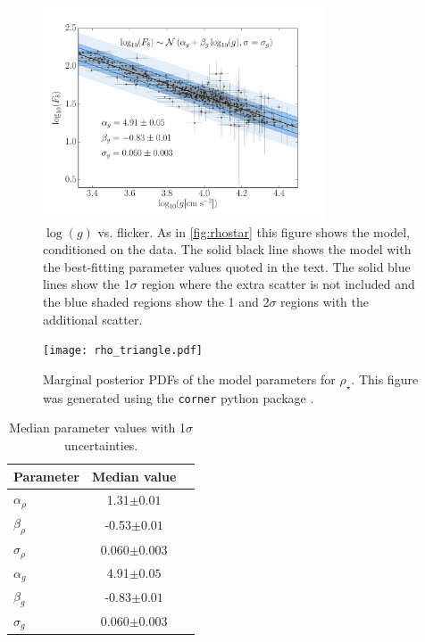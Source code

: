 \documentclass[apjl]{emulateapj}
\newcommand{\rhostar}{$\rho_{\star}$}
\begin{document}
\begin{figure}
\begin{center}
\includegraphics[width=8.4cm,angle=0,clip=true]{flicker_vs_logg.pdf}
\caption{
$\log(g)$ vs. flicker.
As in \ref{fig:rhostar} this figure shows the model, conditioned on the data.
The solid black line shows the model with the best-fitting parameter values
quoted in the text.
The solid blue lines show the 1$\sigma$ region where the extra scatter is not
included and the blue shaded regions show the 1 and 2$\sigma$ regions with the
additional scatter.}
\label{fig:logg}
\end{center}
\end{figure}

\begin{figure}
\begin{center}
\texttt{[image: rho\_triangle.pdf]}
\caption{Marginal posterior PDFs of the model parameters for \rhostar.
This figure was generated using the {\tt corner} python package
\citep{corner}.}
\label{fig:triangle}
\end{center}
\end{figure}

\begin{table}
\begin{center}
\caption{Median parameter values with 1$\sigma$ uncertainties.}
\begin{tabular}{lcc}
\hline\hline
Parameter & Median value \\
    \hline
$\alpha_\rho$   &    1.31$\pm 0.01$   \\
$\beta_\rho$    &    -0.53$\pm 0.01$   \\
$\sigma_\rho$   &    0.060$\pm 0.003$   \\
\hline
$\alpha_g$      &    4.91$\pm 0.05$   \\
$\beta_g$       &   -0.83$\pm 0.01$   \\
$\sigma_g$      &    0.060$\pm 0.003$   \\
    \hline
\end{tabular}
\end{center}
\end{table}
\label{tab:results}
\end{document}
